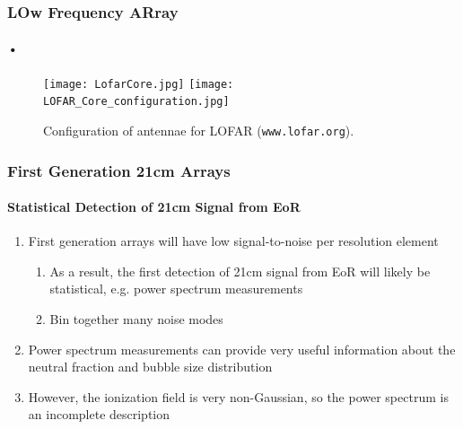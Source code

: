 \documentclass{beamer}
\begin{document}
\begin{frame}
\frametitle{LOw Frequency ARray}
\framesubtitle{•}
\begin{figure}[h]
  \centering
  \texttt{[image: LofarCore.jpg]}
  \texttt{[image: LOFAR\_Core\_configuration.jpg]}
  \caption{Configuration of antennae for LOFAR ({\tt www.lofar.org}).}
  \label{fig:todo}
\end{figure}
\end{frame}


\begin{frame}
\frametitle{First Generation 21cm Arrays}
\framesubtitle{Statistical Detection of 21cm Signal from EoR}
\begin{enumerate}[-]
\item First generation arrays will have low signal-to-noise per resolution element
\begin{enumerate}[$\to$]
\item As a result, the first detection of 21cm signal from EoR will likely be statistical, e.g. power spectrum measurements
\item Bin together many noise modes
\end{enumerate}
\item Power spectrum measurements can provide very useful information about the neutral fraction and bubble size distribution
\item However, the ionization field is very non-Gaussian, so the power spectrum is an incomplete description 
\end{enumerate}
\end{frame}
\end{document}
